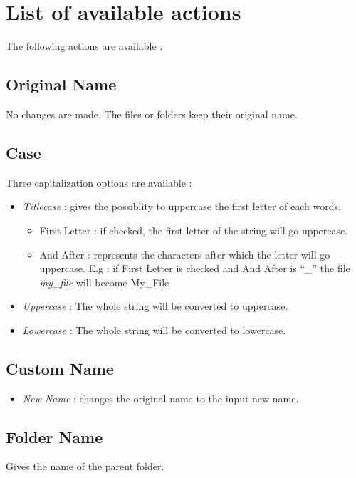 \documentclass[12pt, a4paper]{scrartcl}
\begin{document}
\section{List of available actions}
The following actions are available :
\subsection{Original Name}
No changes are made. The files or folders keep their original name.
\subsection{Case}
Three capitalization options are available :
\begin{itemize}
    \item \emph{Titlecase} : gives the possiblity to uppercase the first letter of each words.
        \begin{itemize}
            \item First Letter : if checked, the first letter of the string will go uppercase. 
            \item And After : represents the characters after which the letter will go uppercase. E.g : if First Letter is checked and And After is ``\_'' the file \emph{my\_file} will become My\_File
        \end{itemize}
    \item \emph{Uppercase} : The whole string will be converted to uppercase.
    \item \emph{Lowercase} : The whole string will be converted to lowercase.
\end{itemize}
\subsection{Custom Name}
\begin{itemize}
    \item \emph{New Name} : changes the original name to the input new name.
\end{itemize}
\subsection{Folder Name}
Gives the name of the parent folder.
\end{document}
